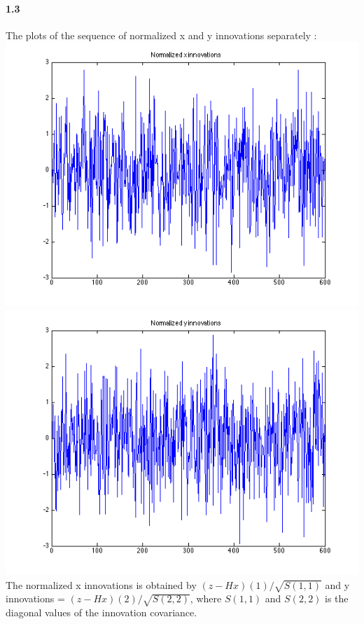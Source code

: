 \documentclass[a4paper]{article}
\begin{document}
\paragraph{1.3 } The plots of the sequence of normalized x and y innovations separately : \\
\includegraphics[scale=.4]{target_1_x_inno.png}
\includegraphics[scale=.4]{target_1_y_inno.png} \\

The normalized x innovations is obtained by $(z - Hx)(1)/\sqrt{S(1,1)}$ and y innovations = $(z - Hx)(2)/\sqrt{S(2,2)}$, where $S(1,1)$ and $S(2,2)$ is the diagonal values of the innovation covariance.\\
\end{document}

